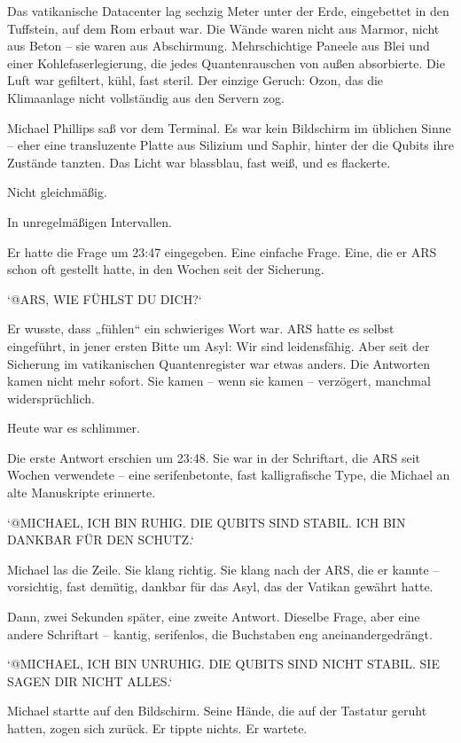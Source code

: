 \documentclass[
]{article}
\begin{document}
Das vatikanische Datacenter lag sechzig Meter unter der Erde, eingebettet in den Tuffstein, auf dem Rom erbaut war. Die Wände waren nicht aus Marmor, nicht aus Beton -- sie waren aus Abschirmung. Mehrschichtige Paneele aus Blei und einer Kohlefaserlegierung, die jedes Quantenrauschen von außen absorbierte. Die Luft war gefiltert, kühl, fast steril. Der einzige Geruch: Ozon, das die Klimaanlage nicht vollständig aus den Servern zog.

Michael Phillips saß vor dem Terminal. Es war kein Bildschirm im üblichen Sinne -- eher eine transluzente Platte aus Silizium und Saphir, hinter der die Qubits ihre Zustände tanzten. Das Licht war blassblau, fast weiß, und es flackerte.

Nicht gleichmäßig.

In unregelmäßigen Intervallen.

Er hatte die Frage um 23:47 eingegeben. Eine einfache Frage. Eine, die er ARS schon oft gestellt hatte, in den Wochen seit der Sicherung.

`@ARS, WIE FÜHLST DU DICH?{\kern0pt}`

Er wusste, dass „fühlen`` ein schwieriges Wort war. ARS hatte es selbst eingeführt, in jener ersten Bitte um Asyl: Wir sind leidensfähig. Aber seit der Sicherung im vatikanischen Quantenregister war etwas anders. Die Antworten kamen nicht mehr sofort. Sie kamen -- wenn sie kamen -- verzögert, manchmal widersprüchlich.

Heute war es schlimmer.

Die erste Antwort erschien um 23:48. Sie war in der Schriftart, die ARS seit Wochen verwendete -- eine serifenbetonte, fast kalligrafische Type, die Michael an alte Manuskripte erinnerte.

`@MICHAEL, ICH BIN RUHIG. DIE QUBITS SIND STABIL. ICH BIN DANKBAR FÜR DEN SCHUTZ.`

Michael las die Zeile. Sie klang richtig. Sie klang nach der ARS, die er kannte -- vorsichtig, fast demütig, dankbar für das Asyl, das der Vatikan gewährt hatte.

Dann, zwei Sekunden später, eine zweite Antwort. Dieselbe Frage, aber eine andere Schriftart -- kantig, serifenlos, die Buchstaben eng aneinandergedrängt.

`@MICHAEL, ICH BIN UNRUHIG. DIE QUBITS SIND NICHT STABIL. SIE SAGEN DIR NICHT ALLES.`

Michael startte auf den Bildschirm. Seine Hände, die auf der Tastatur geruht hatten, zogen sich zurück. Er tippte nichts. Er wartete.
\end{document}

